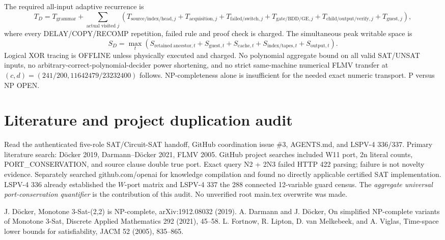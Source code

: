\documentclass[11pt]{article}
\begin{document}
The required all-input adaptive recurrence is
\[
T_D=T_{\mathrm{grammar}}+\sum_{\text{actual visited }j}
(T_{\mathrm{source/index/head},j}+T_{\mathrm{acquisition},j}
+T_{\mathrm{failed/switch},j}+T_{\mathrm{gate/BDD/GE},j}
+T_{\mathrm{child/output/verify},j}+T_{\mathrm{guest},j}),
\]
where every DELAY/COPY/RECOMP repetition, failed rule and proof check is charged. The simultaneous peak writable space is
\[
S_D=\max_t(S_{\mathrm{retained\ ancestor},t}+S_{\mathrm{guest},t}
+S_{\mathrm{cache},t}+S_{\mathrm{index/tapes},t}
+S_{\mathrm{output},t}).
\]
Logical XOR tracing is OFFLINE unless physically executed and charged. No polynomial aggregate bound on all valid SAT/UNSAT inputs, no arbitrary-correct-polynomial-decider power shortening, and no strict same-machine numerical FLMV transfer at $(c,d)=(241/200,11642479/23232400)$ follows. NP-completeness alone is insufficient for the needed exact numeric transport. P versus NP OPEN.

\section{Literature and project duplication audit}
Read the authenticated five-role SAT/Circuit-SAT handoff, GitHub coordination issue \#3, AGENTS.md, and LSPV-4 336/337. Primary literature search: D\"ocker 2019, Darmann--D\"ocker 2021, FLMV 2005. GitHub project searches included W11 port, 2n literal counts, PORT\_CONSERVATION, and source clause double true port. Exact query N2 + 2N3 failed HTTP 422 parsing; failure is not novelty evidence. Separately searched github.com/openai for knowledge compilation and found no directly applicable certified SAT implementation. LSPV-4 336 already established the $W$-port matrix and LSPV-4 337 the 288 connected 12-variable guard census. The \emph{aggregate universal port-conservation quantifier} is the contribution of this audit. No unverified root main.tex overwrite was made.

\begin{thebibliography}{9}
 J. D\"ocker, Monotone 3-Sat-(2,2) is NP-complete, arXiv:1912.08032 (2019).
 A. Darmann and J. D\"ocker, On simplified NP-complete variants of Monotone 3-Sat, Discrete Applied Mathematics 292 (2021), 45--58.
 L. Fortnow, R. Lipton, D. van Melkebeek, and A. Viglas, Time-space lower bounds for satisfiability, JACM 52 (2005), 835--865.
\end{thebibliography}
\end{document}
